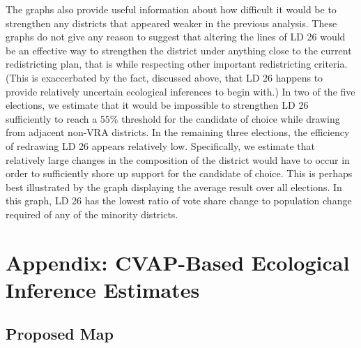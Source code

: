 \documentclass[12pt]{article}
\begin{document}
The graphs also provide useful information about how difficult it
would be to strengthen any districts that appeared weaker in the
previous analysis. These graphs do not give any reason to suggest that
altering the lines of LD 26 would be an effective way to strengthen
the district under anything close to the current redistricting plan,
that is while respecting other important redistricting criteria.
(This is exaccerbated by the fact, discussed above, that LD 26 happens
to provide relatively uncertain ecological inferences to begin with.)
In two of the five elections, we estimate that it would be impossible
to strengthen LD 26 sufficiently to reach a 55\% threshold for the
candidate of choice while drawing from adjacent non-VRA districts. In
the remaining three elections, the efficiency of redrawing LD 26
appears relatively low.  Specifically, we estimate that relatively
large changes in the composition of the district would have to occur
in order to sufficiently shore up support for the candidate of choice.
This is perhaps best illustrated by the graph displaying the average
result over all elections. In this graph, LD 26 has the lowest ratio
of vote share change to population change required of any of the
minority districts.

\clearpage
\appendix

\section{Appendix: CVAP-Based Ecological Inference Estimates}
\subsection{Proposed Map}
\end{document}

